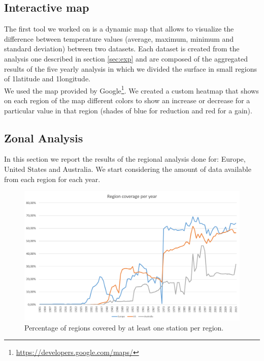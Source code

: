 \documentclass{vldb}
\begin{document}
\subsection{Interactive map}
The first tool we worked on is a dynamic map that allows to visualize the difference between temperature values (average, maximum, minimum and standard deviation) between two datasets. Each dataset is created from the analysis one described in section \ref{sec:exp} and are composed of the aggregated results of the five yearly analysis in which we divided the surface in small regions of 1\degree latitude and 1\degree longitude. \\
We used the map provided by Google\footnote{\href{Google Maps}{https://developers.google.com/maps/}}. We created a custom heatmap that shows on each region of the map different colors to show an increase or decrease for a particular value in that region (shades of blue for reduction and red for a gain). 

\subsection{Zonal Analysis}
In this section we report the results of the regional analysis done for: Europe, United States and Australia. We start considering the amount of data available from each region for each year. 

\begin{figure}[tbh]
\includegraphics[width=1\linewidth]{stationsRegion}
\caption{Percentage of regions covered by at least one station per region.}
\label{fig:stationsRegion}
\end{figure}
\end{document}
